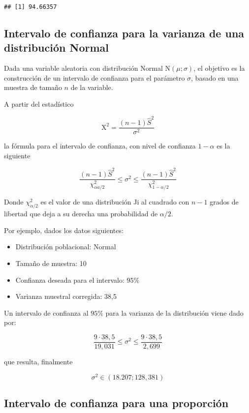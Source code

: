 \documentclass[
]{article}
\providecommand{\tightlist}{%
  \setlength{\itemsep}{0pt}\setlength{\parskip}{0pt}}
\begin{document}
\begin{verbatim}
## [1] 94.66357
\end{verbatim}

\subsection{Intervalo de confianza para la varianza de una distribución Normal}\label{intervalo-de-confianza-para-la-varianza-de-una-distribuciuxf3n-normal}

Dada una variable aleatoria con distribución Normal \(\mathrm{N}(\mu ; \sigma)\), el objetivo es la construcción de un intervalo de confianza para el parámetro \(\sigma\), basado en una muestra de tamaño \(n\) de la variable.

A partir del estadístico

\[
\mathrm{X}^{2}=\frac{(n-1) \hat{S}^{2}}{\sigma^{2}}
\]

la fórmula para el intervalo de confianza, con nivel de confianza \(1-\alpha\) es la siguiente

\[
\frac{(n-1) \hat{S}^{2}}{\chi_{\alpha a / 2}^{2}} \leq \sigma^{2} \leq \frac{(n-1) \hat{S}^{2}}{\chi_{1-\alpha / 2}^{2}}
\]

Donde \(\chi_{\alpha / 2}^{2}\) es el valor de una distribución Ji al cuadrado con \(n-1\) grados de libertad que deja a su derecha una probabilidad de \(\alpha / 2\).

Por ejemplo, dados los datos siguientes:

\begin{itemize}
\tightlist
\item
  Distribución poblacional: Normal
\item
  Tamaño de muestra: 10
\item
  Confianza deseada para el intervalo: \(95 \%\)
\item
  Varianza muestral corregida: 38,5
\end{itemize}

Un intervalo de confianza al \(95 \%\) para la varianza de la distribución viene dado por:

\[
\frac{9 \cdot 38,5}{19,031} \leq \sigma^{2} \leq \frac{9 \cdot 38,5}{2,699}
\]

que resulta, finalmente

\[
\sigma^{2} \in(18.207 ; 128,381)
\]

\subsection{Intervalo de confianza para una proporción}\label{intervalo-de-confianza-para-una-proporciuxf3n}
\end{document}
